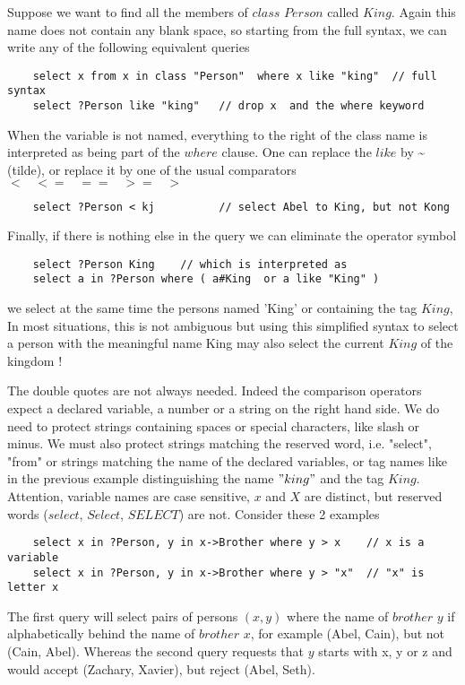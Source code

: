 \documentclass[11pt]{article}
\newcommand{\BL}{\begin{lstlisting}}
\begin{document}
Suppose we want to find all the members of $class$ $Person$ called $King$. Again this name does not
contain any blank space, so starting from the full syntax, we can write any of the following 
equivalent queries
\BL
    select x from x in class "Person"  where x like "king"  // full syntax
    select ?Person like "king"   // drop x  and the where keyword
\end{lstlisting}

When the variable is not named, everything to the right of the class name is interpreted
as being part of the $where$ clause. 
One can replace the $like$ by \~{}  (tilde), or replace it by
one of the usual comparators $< \;\;\; <= \;\;\; == \;\;\; >= \;\;\; >$

\BL
    select ?Person < kj          // select Abel to King, but not Kong
\end{lstlisting}

Finally, if there is nothing else in the query we can eliminate the operator symbol
\BL
    select ?Person King    // which is interpreted as 
    select a in ?Person where ( a#King  or a like "King" )
\end{lstlisting}
we select at the same time the persons named 'King' or containing the tag $King$,
In most situations, this is not ambiguous but using this simplified syntax to select a person
with the meaningful name King may also select the current $King$ of the kingdom !

The double quotes are not always needed. Indeed the comparison operators
expect a declared variable, a number or a string on the right hand side. We do need to protect 
strings containing spaces or special characters, like slash or minus. We must also protect 
strings matching the reserved word, i.e. "select", "from"  or strings  matching the name of 
the declared variables, or tag names like in the previous example distinguishing
 the name $"king"$ and the tag $King$. 
Attention, variable names are case sensitive, $x$ and $X$ are distinct, 
but reserved words ($select$, $Select$, $SELECT$) are not. Consider these 2 examples
\BL
    select x in ?Person, y in x->Brother where y > x    // x is a variable
    select x in ?Person, y in x->Brother where y > "x"  // "x" is letter x
\end{lstlisting}
The first query will select pairs of persons $(x, y)$ where the name of $brother$ $y$
if alphabetically behind the name of $brother$ $x$, for example (Abel, Cain), but
not (Cain, Abel). Whereas the second query requests that $y$ starts with x, y or z
and would accept (Zachary, Xavier), but reject (Abel, Seth).
\end{document}
